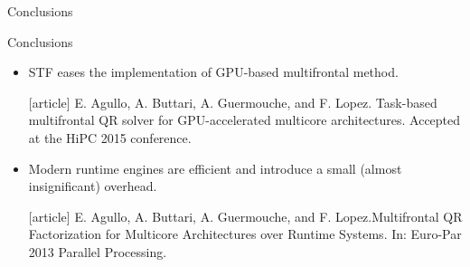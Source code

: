 \begin{frame}{Conclusions}

  \begin{block}{Conclusions}

    \begin{itemize}


    \item STF eases the implementation of GPU-based multifrontal
      method.

      {\scriptsize \begin{thebibliography}{9}
        [article]
       E. Agullo, A. Buttari, A. Guermouche, and
        F. Lopez.  \newblock Task-based multifrontal QR solver for
        GPU-accelerated multicore architectures.  \newblock Accepted
        at the HiPC 2015 conference.
      \end{thebibliography}}

    \item Modern runtime engines are efficient and introduce a small
      (almost insignificant) overhead.

      {\scriptsize \begin{thebibliography}{9}
        [article]
       E. Agullo, A. Buttari, A. Guermouche, and
        F. Lopez.\newblock Multifrontal {QR} Factorization for
        Multicore Architectures over Runtime Systems. \newblock In:
        Euro-Par 2013 Parallel Processing.
      \end{thebibliography}}

    \end{itemize}

  \end{block}
    
\end{frame}


